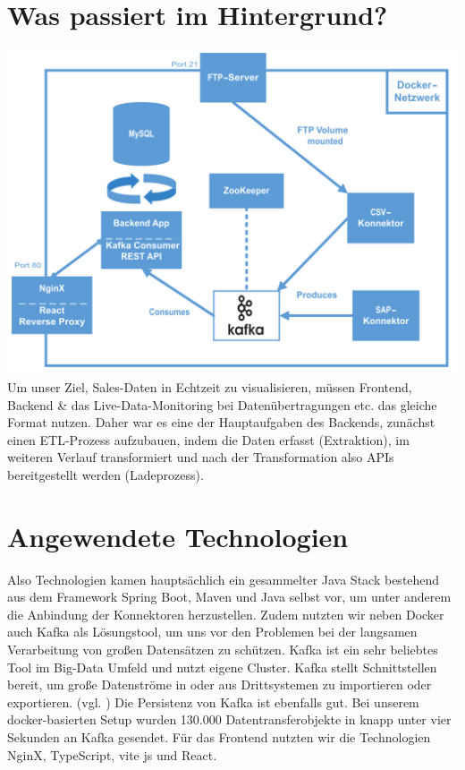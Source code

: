\section*{Was passiert im Hintergrund?}
\includegraphics[width=\linewidth]{src/abbildungen/Architektur.png}
\newline
Um unser Ziel, Sales-Daten in Echtzeit zu visualisieren, müssen Frontend, Backend & das Live-Data-Monitoring bei Datenübertragungen etc. das gleiche Format nutzen.
\newline
\newline
Daher war es eine der Hauptaufgaben des Backends, zunächst einen ETL-Prozess aufzubauen, indem die Daten erfasst (Extraktion), im weiteren Verlauf transformiert und nach der Transformation also APIs bereitgestellt werden (Ladeprozess).
\newline


\section*{Angewendete Technologien}
Also Technologien kamen hauptsächlich ein gesammelter Java Stack bestehend aus dem Framework Spring Boot, Maven und Java selbst vor, um unter anderem die Anbindung der Konnektoren herzustellen.
\newline
\newline
Zudem nutzten wir neben Docker auch Kafka als Lösungstool, um uns vor den Problemen bei der langsamen Verarbeitung von großen Datensätzen zu schützen. Kafka ist ein sehr beliebtes Tool im Big-Data Umfeld und nutzt eigene Cluster. Kafka stellt Schnittstellen bereit, um große Datenströme in oder aus Drittsystemen zu importieren oder exportieren. (vgl. \cite{kafka2018})
\newline
\newline
Die Persistenz von Kafka ist ebenfalls gut. Bei unserem docker-basierten Setup wurden 130.000 Datentransferobjekte in knapp unter vier Sekunden an Kafka gesendet.
\newline
Für das Frontend nutzten wir die Technologien NginX, TypeScript, vite js und React.
